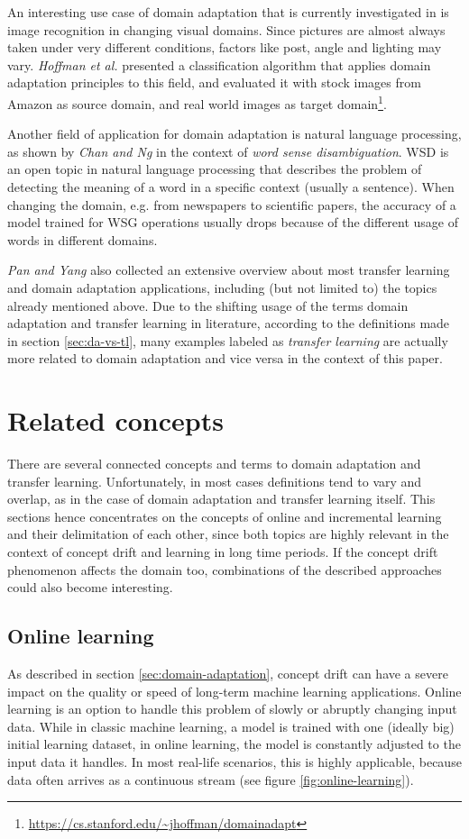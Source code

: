 An interesting use case of domain adaptation that is currently investigated in is image recognition in changing visual domains. Since pictures are almost always taken under very different conditions, factors like post, angle and lighting may vary. \textit{Hoffman et al.} presented a classification algorithm that applies domain adaptation principles to this field, and evaluated it with stock images from Amazon as source domain, and real world images as target domain\footnote{\url{https://cs.stanford.edu/~jhoffman/domainadapt}}. \cite{Hoffman2013}

Another field of application for domain adaptation is natural language processing, as shown by \textit{Chan and Ng} in the context of \textit{word sense disambiguation}. WSD is an open topic in natural language processing that describes the problem of detecting the meaning of a word in a specific context (usually a sentence). When changing the domain, e.g. from newspapers to scientific papers, the accuracy of a model trained for WSG operations usually drops because of the different usage of words in different domains. \cite{Chan2007}

\textit{Pan and Yang} also collected an extensive overview about most transfer learning and domain adaptation applications, including (but not limited to) the topics already mentioned above. Due to the shifting usage of the terms domain adaptation and transfer learning in literature, according to the definitions made in section \ref{sec:da-vs-tl}, many examples labeled as \textit{transfer learning} are actually more related to domain adaptation and vice versa in the context of this paper. \cite{Pan2010}

\section{Related concepts}
There are several connected concepts and terms to domain adaptation and transfer learning. Unfortunately, in most cases definitions tend to vary and overlap, as in the case of domain adaptation and transfer learning itself. This sections hence concentrates on the concepts of online and incremental learning and their delimitation of each other, since both topics are highly relevant in the context of concept drift and learning in long time periods. If the concept drift phenomenon affects the domain too, combinations of the described approaches could also become interesting.

\subsection{Online learning}
As described in section \ref{sec:domain-adaptation}, concept drift can have a severe impact on the quality or speed of long-term machine learning applications. Online learning is an option to handle this problem of slowly or abruptly changing input data. While in classic machine learning, a model is trained with one (ideally big) initial learning dataset, in online learning, the model is constantly adjusted to the input data it handles. In most real-life scenarios, this is highly applicable, because data often arrives as a continuous stream (see figure \ref{fig:online-learning}). 

